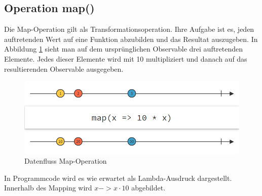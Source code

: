 \subsection{Operation map()}
Die Map-Operation gilt als Transformationsoperation. Ihre Aufgabe ist es, jeden auftretenden Wert auf eine Funktion abzubilden und das Resultat auszugeben. In Abbildung \ref{pic:map} sieht man auf dem ursprünglichen Observable drei auftretenden Elemente. Jedes dieser Elemente wird mit 10 multipliziert und danach auf das resultierenden Observable ausgegeben. 
\begin{figure}
	\centering
	\includegraphics[width=1\textwidth]{Abb/map}
	\caption{Datenfluss Map-Operation}
	\label{pic:map}
\end{figure}
 
In Programmcode wird es wie erwartet als Lambda-Ausdruck dargestellt. Innerhalb des Mapping wird $x -> x \cdot 10$ abgebildet.

